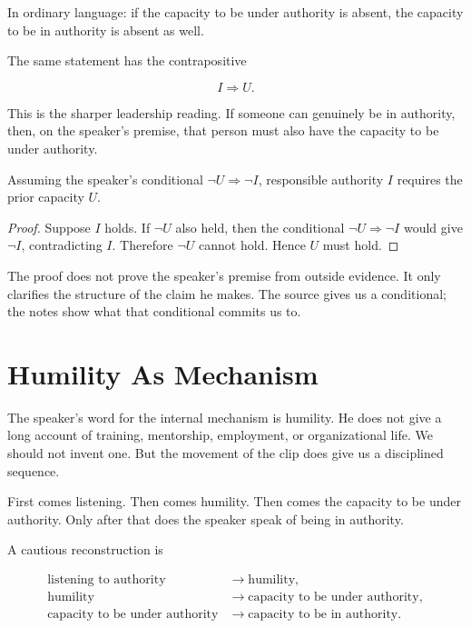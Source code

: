 In ordinary language: if the capacity to be under authority is absent, the capacity to be in authority is absent as well.

The same statement has the contrapositive

\begin{equation}
I \Longrightarrow U.
\end{equation}

This is the sharper leadership reading. If someone can genuinely be in authority, then, on the speaker's premise, that person must also have the capacity to be under authority.

\begin{proposition}
Assuming the speaker's conditional \(\neg U \Longrightarrow \neg I\), responsible authority \(I\) requires the prior capacity \(U\).
\end{proposition}

\begin{proof}
Suppose \(I\) holds. If \(\neg U\) also held, then the conditional \(\neg U \Longrightarrow \neg I\) would give \(\neg I\), contradicting \(I\). Therefore \(\neg U\) cannot hold. Hence \(U\) must hold.
\end{proof}

The proof does not prove the speaker's premise from outside evidence. It only clarifies the structure of the claim he makes. The source gives us a conditional; the notes show what that conditional commits us to.

\section{Humility As Mechanism}

The speaker's word for the internal mechanism is humility. He does not give a long account of training, mentorship, employment, or organizational life. We should not invent one. But the movement of the clip does give us a disciplined sequence.

First comes listening. Then comes humility. Then comes the capacity to be under authority. Only after that does the speaker speak of being in authority.

A cautious reconstruction is

\begin{align}
\text{listening to authority}
&\longrightarrow
\text{humility},\\
\text{humility}
&\longrightarrow
\text{capacity to be under authority},\\
\text{capacity to be under authority}
&\longrightarrow
\text{capacity to be in authority}.
\end{align}

